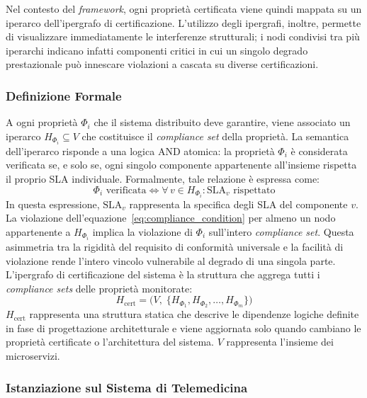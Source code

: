 Nel contesto del \textit{framework}, ogni proprietà certificata viene quindi mappata su un
iperarco dell'ipergrafo di certificazione. L'utilizzo degli ipergrafi, inoltre, permette di
visualizzare immediatamente le interferenze strutturali; i nodi condivisi tra più iperarchi 
indicano infatti componenti critici in cui un singolo degrado prestazionale può innescare violazioni a cascata su diverse certificazioni.

\subsubsection{Definizione Formale}
\label{sec:def_formale_ipergrafo}

A ogni proprietà $\Phi_i$ che il sistema distribuito deve garantire, viene associato un iperarco
$H_{\Phi_i} \subseteq V$ che costituisce il \textit{compliance set} della proprietà. La
semantica dell'iperarco risponde a una logica AND atomica: la proprietà $\Phi_i$ è considerata
verificata se, e solo se, ogni singolo componente appartenente all'insieme rispetta il proprio
\gls{SLA} individuale. Formalmente, tale relazione è espressa come:
\begin{equation}
\label{eq:compliance_condition}
\Phi_i \text{ verificata} \iff \forall\, v \in H_{\Phi_i} : \text{SLA}_v \text{ rispettato}
\end{equation}
In questa espressione, $\text{SLA}_v$ rappresenta la specifica degli \gls{SLA} del componente $v$.
La violazione dell'equazione~\eqref{eq:compliance_condition} per almeno un nodo appartenente a $H_{\Phi_i}$ 
implica la violazione di $\Phi_i$ sull'intero \textit{compliance set}. Questa asimmetria tra la rigidità 
del requisito di conformità universale e la facilità di violazione rende l'intero vincolo 
vulnerabile al degrado di una singola parte. L'ipergrafo di certificazione del sistema è la struttura 
che aggrega tutti i \textit{compliance sets} delle proprietà monitorate:
\begin{equation}
\label{eq:h_cert}
H_{\text{cert}} = \bigl(V,\; \{H_{\Phi_1}, H_{\Phi_2}, \ldots, H_{\Phi_m}\}\bigr)
\end{equation}
$H_{\text{cert}}$ rappresenta una struttura statica che descrive le dipendenze logiche definite in
fase di progettazione architetturale e viene aggiornata solo quando cambiano le proprietà
certificate o l'architettura del sistema. $V$ rappresenta l'insieme dei microservizi.

\subsubsection{Istanziazione sul Sistema di Telemedicina}
\label{sec:istanziazione_telemedicina}

